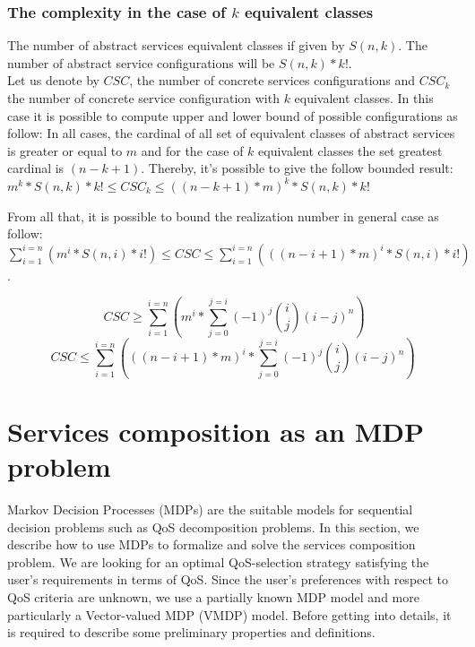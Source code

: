 \documentclass[10pt,journal,compsoc]{IEEEtran}
\begin{document}
\subsubsection{The complexity in the case of $k$ equivalent classes}
The number of abstract services equivalent classes if given by $S(n,k)$. The number of abstract service configurations will be $S(n,k)*k!$. \\
Let us denote by $CSC$, the number of concrete services configurations and $CSC_k$ the number of concrete service configuration with $k$ equivalent classes.  In this case it is possible to compute upper and lower bound of possible configurations as follow: In all cases, the cardinal of all set of equivalent classes of abstract services is greater or equal to $m$ and for the case of $k$ equivalent classes the set greatest cardinal is $(n-k+1)$. Thereby, it's possible to give the follow bounded result: $m^k*S(n,k)*k! \leq CSC_k \leq ((n-k+1)*m)^k*S(n,k)*k! $

From all that, it is possible to bound the realization number in general case as follow:
$  \sum_{i=1}^{i=n}  (m^i*S(n,i) *i! ) \leq CSC \leq  \sum_{i=1}^{i=n}  (((n-i+1)*m)^i*S(n,i)*i!)$.

$$\ CSC \geq \sum_{i=1}^{i=n}  (m^i*\sum_{j=0}^{j=i}(-1)^j \binom i j (i-j)^n)$$
$$CSC \leq  \sum_{i=1}^{i=n}  (((n-i+1)*m)^i*\sum_{j=0}^{j=i}(-1)^j \binom i j (i-j)^n) $$


\section{Services composition as an MDP problem} \label{sec:Scomp-Formulation}
Markov Decision Processes (MDPs) are the suitable models for sequential decision problems such as QoS decomposition problems. In this section, we describe how to use MDPs to formalize and solve the services composition problem. We are looking for an optimal QoS-selection strategy satisfying the user's requirements in terms of QoS. 
Since the user's preferences with respect to QoS criteria are unknown, %
we use a partially known MDP model and more particularly a Vector-valued MDP (VMDP) model. Before getting into details, it is required to describe some preliminary properties and definitions.\\
\end{document}
